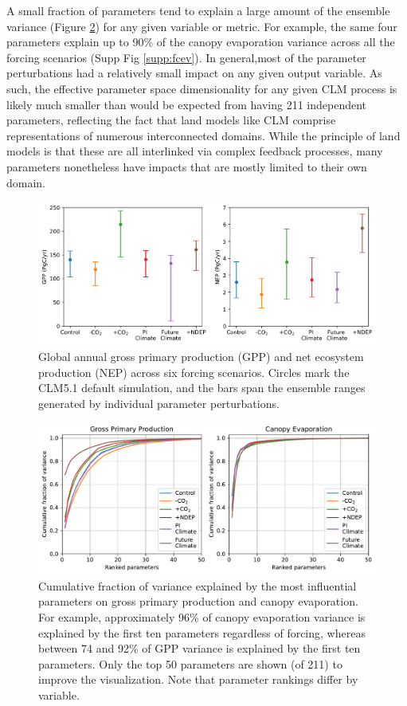 \documentclass[draft]{agujournal2019}
\begin{document}
A small fraction of parameters tend to explain a large amount of the ensemble variance (Figure \ref{fig:variance}) for any given variable or metric. For example, the same four parameters explain up to 90\% of the canopy evaporation variance across all the forcing scenarios (Supp Fig \ref{supp:fcev}). In general,most of the parameter perturbations had a relatively small impact on any given output variable. As such, the effective parameter space dimensionality for any given CLM process is likely much smaller than would be expected from having 211 independent parameters, reflecting the fact that land models like CLM comprise representations of numerous interconnected domains. While the principle of land models is that these are all interlinked via complex feedback processes, many parameters nonetheless have impacts that are mostly limited to their own domain. 

\begin{figure}[h]
\centering
\includegraphics[width=\textwidth]{../figs/ranges.png}
\caption{Global annual gross primary production (GPP) and net ecosystem production (NEP) across six forcing scenarios. Circles mark the CLM5.1 default simulation, and the bars span the ensemble ranges generated by individual parameter perturbations.}
\label{fig:ranges}
\end{figure}

\begin{figure}[h]
\centering
\includegraphics[width=\textwidth]{../figs/variance.pdf}
\caption{Cumulative fraction of variance explained by the most influential parameters on gross primary production and canopy evaporation. For example, approximately 96\% of canopy evaporation variance is explained by the first ten parameters regardless of forcing, whereas between 74 and 92\% of GPP variance is explained by the first ten parameters. Only the top 50 parameters are shown (of 211) to improve the visualization. Note that parameter rankings differ by variable.}
\label{fig:variance}
\end{figure}
\end{document}
